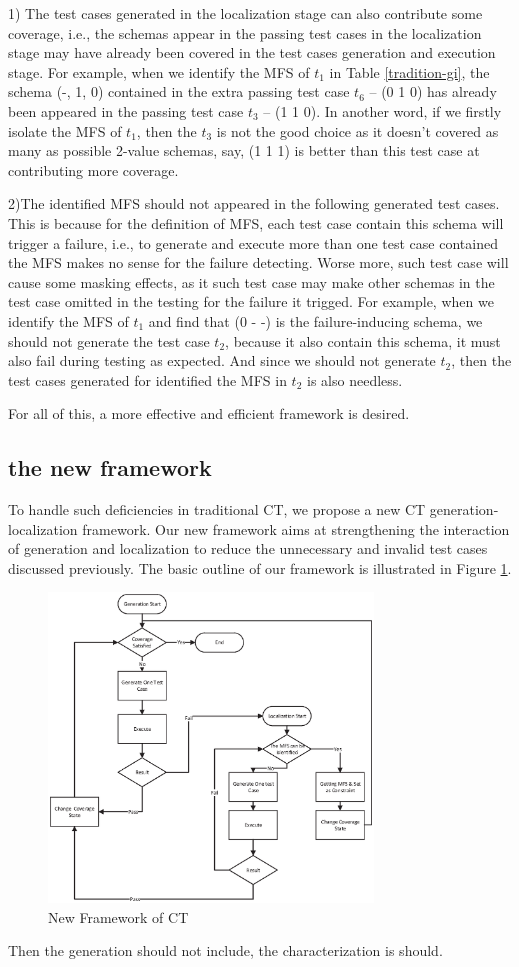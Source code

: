 \documentclass{sig-alternate}
\begin{document}
1) The test cases generated in the localization stage can also contribute some coverage, i.e.,  the schemas appear in the passing test cases in the localization stage may have already been covered in the test cases generation and execution stage.  For example, when we identify the MFS of $t_{1}$ in Table \ref{tradition-gi}, the schema (-, 1, 0) contained in the extra passing test case $t_{6}$ -- (0 1 0) has already been appeared in the passing test case $t_{3}$ -- (1 1 0). In another word, if we firstly isolate the MFS of $t_{1}$, then the $t_{3}$ is not the good choice as it doesn't covered as many as possible 2-value schemas, say, (1 1 1) is better than this test case at contributing more coverage.

2)The identified MFS should not appeared in the following generated test cases.  This is because for the definition of MFS, each test case contain this schema will trigger a failure, i.e., to generate and execute more than one test case contained the MFS makes no sense for the failure detecting. Worse more, such test case will cause some masking effects, as it such test case may make other schemas in the test case omitted in the testing for the failure it trigged.  For example, when we identify the MFS of $t_{1}$ and find that (0 - -) is the failure-inducing schema, we should not generate the test case $t_{2}$, because it also contain this schema, it must also fail during testing as expected. And since we should not generate $t_{2}$, then the test cases generated for identified the MFS in $t_{2}$ is also needless.

For all of this, a more effective and efficient framework is desired.

\subsection{the new framework}
To handle such deficiencies in traditional CT, we propose a new CT generation-localization framework. Our new framework aims at strengthening the interaction of generation and localization to reduce the unnecessary and invalid test cases discussed previously. The basic outline of our framework is illustrated in Figure \ref{new-life}.
\begin{figure}
 \includegraphics[width=3.4in]{baicOutline.eps}
\caption{New Framework of CT}
\label{new-life}
\end{figure}
Then the generation should not include, the characterization is should.
\end{document}
